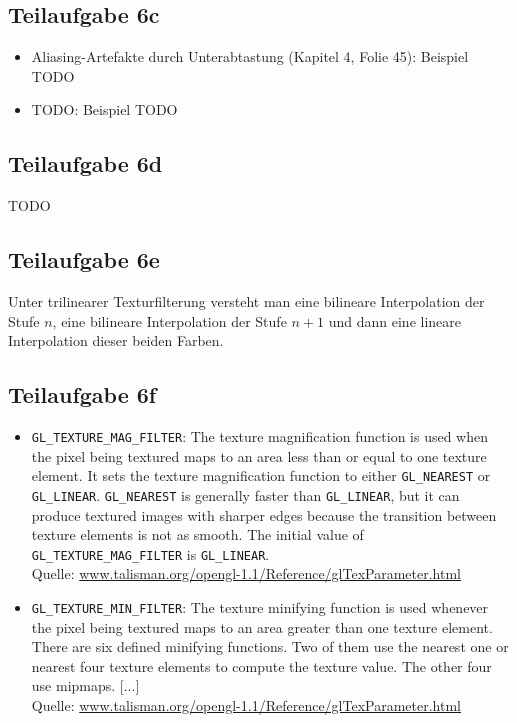 \documentclass[a4paper]{scrartcl}
\begin{document}
\subsection*{Teilaufgabe 6c}
\begin{itemize}
    \item Aliasing-Artefakte durch Unterabtastung (Kapitel 4, Folie 45): Beispiel TODO
    \item TODO: Beispiel TODO
\end{itemize}

\subsection*{Teilaufgabe 6d}
TODO

\subsection*{Teilaufgabe 6e}
Unter trilinearer Texturfilterung versteht man eine bilineare Interpolation
der Stufe $n$, eine bilineare Interpolation der Stufe $n+1$ und dann eine
lineare Interpolation dieser beiden Farben.

\subsection*{Teilaufgabe 6f}
\begin{itemize}
    \item \texttt{GL\_TEXTURE\_MAG\_FILTER}: The texture magnification function
    is used when the pixel being textured maps to an area less than or equal to
    one texture element. It sets the texture magnification function to either
    \texttt{GL\_NEAREST} or \texttt{GL\_LINEAR}. \texttt{GL\_NEAREST} is
    generally faster than
    \texttt{GL\_LINEAR}, but it can produce textured images with sharper edges
    because the transition between texture elements is not as smooth. The
    initial value of \texttt{GL\_TEXTURE\_MAG\_FILTER} is \texttt{GL\_LINEAR}.\\
    Quelle: \href{https://www.talisman.org/opengl-1.1/Reference/glTexParameter.html}{www.talisman.org/opengl-1.1/Reference/glTexParameter.html}
    \item \texttt{GL\_TEXTURE\_MIN\_FILTER}: The texture minifying function is used whenever the pixel being textured maps to an area greater than one texture element. There are six defined minifying functions. Two of them use the nearest one or nearest four texture elements to compute the texture value. The other four use mipmaps. [...]\\
    Quelle: \href{https://www.talisman.org/opengl-1.1/Reference/glTexParameter.html}{www.talisman.org/opengl-1.1/Reference/glTexParameter.html}
\end{itemize}
\end{document}

